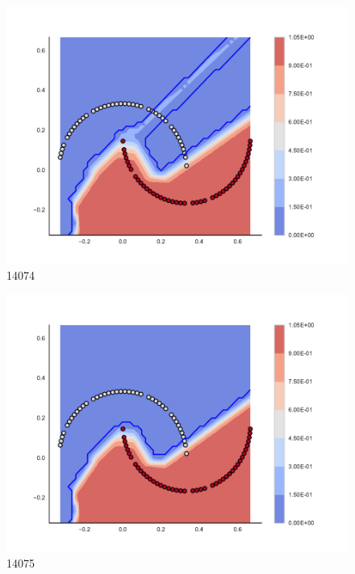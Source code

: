 \begin{subfigure}[b]{0.09\textwidth}
    \includegraphics[clip, trim=2.35cm 1.75cm 4.5cm 0cm,width=\textwidth]{img/convergence/14074.pdf}
    \caption{14074}
    \label{fig:convergence_14074}
\end{subfigure}
%
\begin{subfigure}[b]{0.09\textwidth}
    \includegraphics[clip, trim=2.35cm 1.75cm 4.5cm 0cm,width=\textwidth]{img/convergence/14075.pdf}
    \caption{14075}
    \label{fig:convergence_14075}
\end{subfigure}
%
